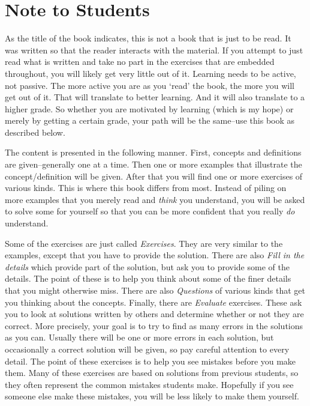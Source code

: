 \chapter*{Note to Students}

As the title of the book indicates, this is not a book that is just to be read.  It was written
so that the reader interacts with the material.  If you attempt to just read what is 
written and take no part in the exercises that are embedded throughout, you will likely
get very little out of it.  Learning needs to be active, not passive.  The more active you are
as you `read' the book, the more you will get out of it.  That will translate to better learning.
And it will also translate to a higher grade.  So whether you are motivated by learning (which is
my hope) or merely by getting a certain grade, your path will be the same--use this book as 
described below.

The content is presented in the following manner.  
First, concepts and definitions are given--generally one at a time.  
Then one or more examples that illustrate the concept/definition will be given.  
After that you will find one or more exercises of various kinds.  This is where this book
differs from most.  Instead of piling on more examples that you merely read and {\em think} you understand,
you will be asked to solve some for yourself so that you can be more confident that you really {\em do}
understand. 

Some of the exercises are just called {\em Exercises}.  
They are very similar to the examples, except that you have to provide the solution.  
There are also {\em Fill in the details} which provide part of the solution, but ask you to provide
some of the details.  The point of these is to help you think about some of the finer details that
you might otherwise miss.  There are also {\em Questions} of various kinds that get you thinking about
the concepts. Finally, there are {\em Evaluate} exercises.  These ask you to look at solutions written
by others and determine whether or not they are correct.  More precisely, your goal is to try to find
as many errors in the solutions as you can.  Usually there will be one or more errors in each solution,
but occasionally a correct solution will be given, so pay careful attention to every detail.  The point 
of these exercises is to help you see mistakes before you make them.  Many of these exercises are based
on solutions from previous students, so they often represent the common mistakes students make.
Hopefully if you see someone else make these mistakes, you will be less likely to make them yourself. 


